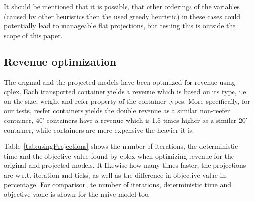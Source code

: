 It should be mentioned that it is possible, that other orderings of the variables (caused by other heuristics then the used greedy heuristic) in these cases could potentially lead to manageable flat projections, but testing this is outside the scope of this paper.  

\subsection{Revenue optimization}
The original and the projected models have been optimized for revenue using cplex. Each transported container yields a revenue which is based on its type, i.e. on the size, weight and refer-property of the container types. More specifically, for our tests, reefer containers yields the double revenue as a similar non-reefer container, 40' containers have a revenue which is 1.5 times higher as a similar 20' container, while containers are more expensive the heavier it is.    

Table~\ref{tab:usingProjections} shows the number of iterations, the deterministic time and the objective value found by cplex when optimizing revenue for the original and projected models. It likewise how many times faster, the projections are w.r.t. iteration and ticks, as well as the difference in objective value in percentage. For comparison, te number of iterations, deterministic time and objective vaule is shown for the naive model too. 

